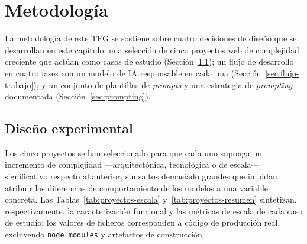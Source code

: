 
\chapter{Metodología} \label{chap:Metodology}

La metodología de este \ac{TFG} se sostiene sobre cuatro decisiones de diseño que se desarrollan en este capítulo: una selección de cinco proyectos web de complejidad creciente que actúan como casos de estudio (Sección~\ref{sec:diseno-experimental}); un flujo de desarrollo en cuatro fases con un modelo de \ac{IA} responsable en cada una (Sección~\ref{sec:flujo-trabajo}); y un conjunto de plantillas de \textit{prompts} y una estrategia de \textit{prompting} documentada (Sección~\ref{sec:prompting}).

\section{Diseño experimental} \label{sec:diseno-experimental}

Los cinco proyectos \cite{URL::TFG-Web} se han seleccionado para que cada uno suponga un incremento de complejidad ---arquitectónica, tecnológica o de escala--- significativo respecto al anterior, sin saltos demasiado grandes que impidan atribuir las diferencias de comportamiento de los modelos a una variable concreta. Las Tablas~\ref{tab:proyectos-escala} y~\ref{tab:proyectos-resumen} sintetizan, respectivamente, la caracterización funcional y las métricas de escala de cada caso de estudio; los valores de ficheros corresponden a código de producción real, excluyendo \texttt{node\_modules} y artefactos de construcción.

